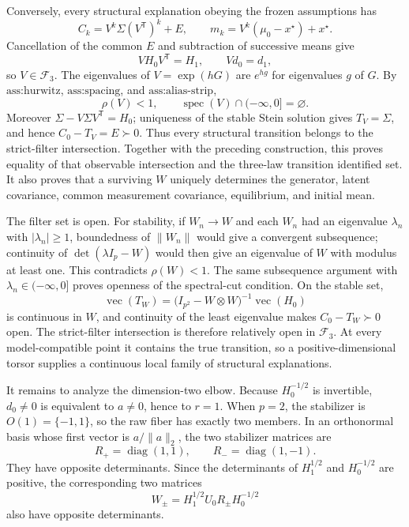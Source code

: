 Conversely, every structural explanation obeying the frozen assumptions has
\[
 C_k=V^k\Sigma(V^{\mathsf T})^k+E,
 \qquad
 m_k=V^k(\mu_0-x^\star)+x^\star.
\]
Cancellation of the common \(E\) and subtraction of successive means give
\[
 VH_0V^{\mathsf T}=H_1,
 \qquad Vd_0=d_1,
\]
so \(V\in\mathcal F_3\).  The eigenvalues of \(V=\exp(hG)\) are \(e^{hg}\) for eigenvalues \(g\) of \(G\).  By \(\text{ass:hurwitz}\), \(\text{ass:spacing}\), and \(\text{ass:alias-strip}\),
\[
 \rho(V)<1,
 \qquad
 \operatorname{spec}(V)\cap(-\infty,0]=\varnothing.
\]
Moreover \(\Sigma-V\Sigma V^{\mathsf T}=H_0\); uniqueness of the stable Stein solution gives \(T_V=\Sigma\), and hence \(C_0-T_V=E\succ0\).  Thus every structural transition belongs to the strict-filter intersection.  Together with the preceding construction, this proves equality of that observable intersection and the three-law transition identified set.  It also proves that a surviving \(W\) uniquely determines the generator, latent covariance, common measurement covariance, equilibrium, and initial mean.

The filter set is open.  For stability, if \(W_n\to W\) and each \(W_n\) had an eigenvalue \(\lambda_n\) with \(|\lambda_n|\ge1\), boundedness of \(\lVert W_n\rVert\) would give a convergent subsequence; continuity of \(\det(\lambda I_p-W)\) would then give an eigenvalue of \(W\) with modulus at least one.  This contradicts \(\rho(W)<1\).  The same subsequence argument with \(\lambda_n\in(-\infty,0]\) proves openness of the spectral-cut condition.  On the stable set,
\[
 \operatorname{vec}(T_W)
 =\bigl(I_{p^2}-W\otimes W\bigr)^{-1}\operatorname{vec}(H_0)
\]
is continuous in \(W\), and continuity of the least eigenvalue makes \(C_0-T_W\succ0\) open.  The strict-filter intersection is therefore relatively open in \(\mathcal F_3\).  At every model-compatible point it contains the true transition, so a positive-dimensional torsor supplies a continuous local family of structural explanations.

It remains to analyze the dimension-two elbow.  Because \(H_0^{-1/2}\) is invertible, \(d_0\ne0\) is equivalent to \(a\ne0\), hence to \(r=1\).  When \(p=2\), the stabilizer is \(O(1)=\{-1,1\}\), so the raw fiber has exactly two members.  In an orthonormal basis whose first vector is \(a/\lVert a\rVert_2\), the two stabilizer matrices are
\[
 R_+=\operatorname{diag}(1,1),
 \qquad R_-=\operatorname{diag}(1,-1).
\]
They have opposite determinants.  Since the determinants of \(H_1^{1/2}\) and \(H_0^{-1/2}\) are positive, the corresponding two matrices
\[
 W_\pm=H_1^{1/2}U_0R_\pm H_0^{-1/2}
\]
also have opposite determinants.

